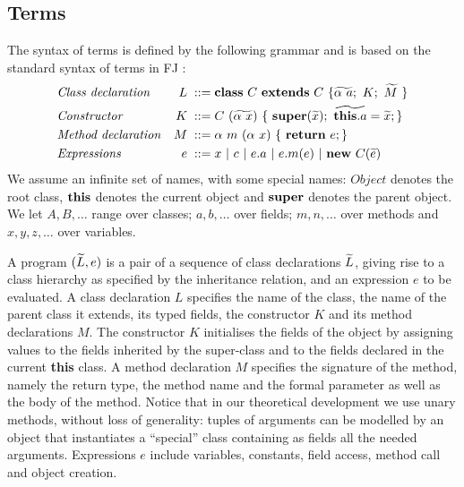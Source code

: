 \subsection{Terms}
\label{sec:terms}
The syntax of terms is defined by the following grammar and is based on the standard syntax of terms in FJ \cite{featherweight}:
\begin{align*}
     & \mbox{\textit{Class declaration}}  & L \; ::= \; & \syndecl{C}{C}{\wt{\alpha \ a};\ K; \ \wt{M}\ }                         \\
     & \mbox{\textit{Constructor}}        & K \;::=\;   & C\ (\wt{\alpha\ x})\ \{\ \synsuper(\wt{x});\ \wt{\synthis.a}=\wt{x}; \} \\
     & \mbox{\textit{Method declaration}} & M \; ::= \; & \alpha \ m\ (\alpha \ x)\ \{\ \synret e; \}                             \\
     & \mbox{\textit{Expressions}}        & e \; ::=\;  & x\ |\  c\ |\ e.a\ |\ e.m(e) \ | \ \synnew C(\wt{e})
\end{align*}
We assume an infinite set of names, with some special names:
$\mathit{Object}$ denotes the root class, $\mathbf{this}$ denotes the current object and $\mathbf{super}$ denotes the parent object.
We let  $A, B,\ldots$ range over classes; $a, b,\ldots$ over fields; $m, n,\ldots$ over methods and $x, y, z, \ldots$ over variables.

A {program} $(\widetilde{L}, e)$ is a pair of a sequence of class declarations $\widetilde{L}$, giving rise to a class hierarchy as specified by the inheritance relation, and an expression $e$ to be evaluated.
%
A class declaration $L$ specifies the name of the class, the name of the parent class it extends, its typed fields, the constructor $K$ and its method declarations $M$.
The constructor $K$ initialises the fields of the object by assigning values to the fields inherited by the super-class and to the fields declared in the current \textbf{this} class.
%
A method declaration $M$ specifies the signature of the method, namely the return type, the method name and the formal parameter as well as the body of the method.
Notice that in our theoretical development we use unary methods, without loss of generality: tuples of arguments can be modelled by an object that instantiates a ``special'' class containing as fields all the needed arguments.
Expressions $e$ include variables, constants, field access, method call and object creation.


